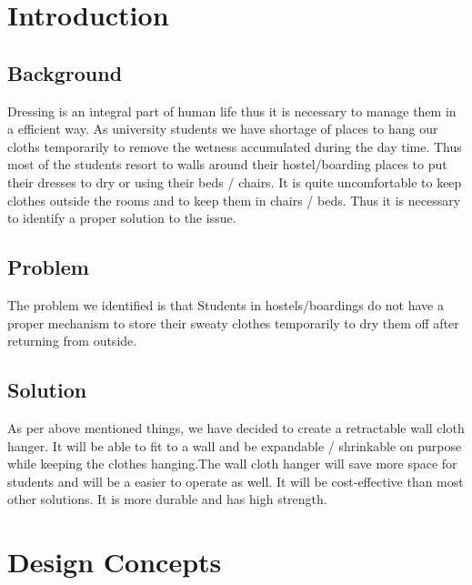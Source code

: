 \documentclass[12pt,a4paper]{article}
\begin{document}
\newpage

\setcounter{page}{1}

\setcounter{secnumdepth}{3}

\section{Introduction}
\renewcommand{\arraystretch}{1.5} %




\subsection{Background}

Dressing is an integral part of human life thus it is necessary to manage them in a efficient way. As university students we have shortage of places to hang our cloths temporarily to remove the wetness accumulated during the day time. Thus most of the students resort to walls around their hostel/boarding places to put their dresses to dry or using their beds / chairs. It is quite uncomfortable to keep clothes outside the rooms and to keep them in chairs / beds. 
Thus it is necessary to identify a proper solution to the issue. 


\subsection{Problem}
 
The problem we identified is that Students in hostels/boardings do not have a proper mechanism to store their sweaty clothes temporarily to dry them off after returning from outside.




\subsection{Solution}
As per above mentioned things, we have decided to create a retractable wall cloth hanger. It will be able to fit to a wall and be expandable / shrinkable on purpose while keeping the clothes hanging.The wall cloth hanger will save more space for students and will be a easier to operate as well. It will be cost-effective than most other solutions. It is more durable and has high strength. 


\newpage


\section{Design Concepts}
\end{document}
